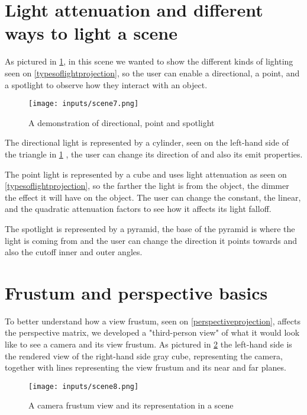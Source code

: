 \documentclass[cic,tc,english]{iiufrgs}
\begin{document}
\section{Light attenuation and different ways to light a scene}
\label{typesoflightscene}

As pictured in \cref{scene7demo}, in this scene we wanted to show the different kinds of lighting seen on \cref{typesoflightprojection}, so the user can enable a directional, a point, and a spotlight to observe how they interact with an object.

\begin{figure}[hbt!]
    \caption{A demonstration of directional, point and spotlight}
    \begin{center}
        \texttt{[image: inputs/scene7.png]}
    \end{center}
    \label{scene7demo}
\end{figure}

The directional light is represented by a cylinder, seen on the left-hand side of the triangle in \cref{scene7demo} , the user can change its direction of  and also its emit properties.

The point light is represented by a cube and uses light attenuation as seen on \cref{typesoflightprojection}, so the farther the light is from the object, the dimmer the effect it will have on the object. The user can change the constant, the linear, and the quadratic attenuation factors to see how it affects its light falloff.

The spotlight is represented by a pyramid, the base of the pyramid is where the light is coming from and the user can change the direction it points towards and also the cutoff inner and outer angles.

%
\section{Frustum and perspective basics}

To better understand how a view frustum, seen on \cref{perspectiveprojection}, affects the perspective matrix, we developed a "third-person view" of what it would look like to see a camera and its view frustum. As pictured in \cref{scene8demo} the left-hand side is the rendered view of the right-hand side gray cube, representing the camera, together with lines representing the view frustum and its near and far planes.

\begin{figure}[hbt!]
    \caption{A camera frustum view and its representation in a scene}
    \begin{center}
        \texttt{[image: inputs/scene8.png]}
    \end{center}
    \label{scene8demo}
\end{figure}
\end{document}
